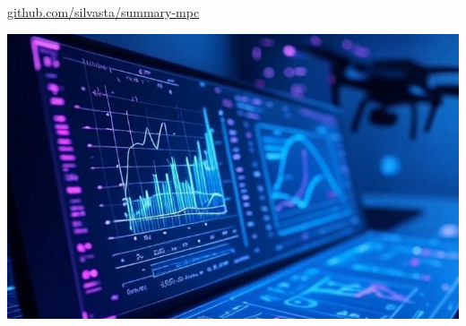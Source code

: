 
\begin{center}
	\colorbox{RoyalBlue}{\textcolor{white}
		{}}
	\colorbox{lightgray}{\textcolor{Black}
		{}}
	{\footnotesize
		\url{github.com/silvasta/summary-mpc}}

	\includegraphics[width=\columnwidth]{images/header-1.jpg}


\end{center}




